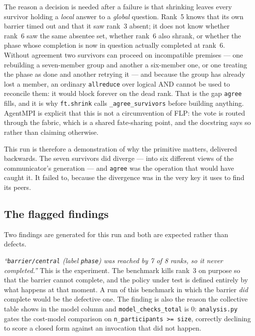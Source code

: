 \documentclass[11pt]{article}
\begin{document}
The reason a decision is needed after a failure is that shrinking leaves every survivor
holding a \emph{local} answer to a \emph{global} question. Rank~5 knows that its own
barrier timed out and that it saw rank~3 absent; it does not know whether rank~6 saw the
same absentee set, whether rank~6 also shrank, or whether the phase whose completion is
now in question actually completed at rank~6. Without agreement two survivors can proceed
on incompatible premises --- one rebuilding a seven-member group and another a six-member
one, or one treating the phase as done and another retrying it --- and because the group
has already lost a member, an ordinary \texttt{allreduce} over logical AND cannot be used
to reconcile them: it would block forever on the dead rank. That is the gap
\texttt{agree} fills, and it is why \texttt{ft.shrink} calls
\texttt{\_agree\_survivors} before building anything. AgentMPI is explicit that this is
not a circumvention of FLP: the vote is routed through the fabric, which is a shared
fate-sharing point, and the docstring says so rather than claiming otherwise.

This run is therefore a demonstration of why the primitive matters, delivered backwards.
The seven survivors did diverge --- into six different views of the communicator's
generation --- and \texttt{agree} was the operation that would have caught it. It failed
to, because the divergence was in the very key it uses to find its peers.

\subsection{The flagged findings}

Two findings are generated for this run and both are expected rather than defects.

\emph{``\texttt{barrier/central} (label \texttt{phase}) was reached by 7 of 8 ranks, so it
never completed.''} This is the experiment. The benchmark kills rank~3 on purpose so that
the barrier cannot complete, and the policy under test is defined entirely by what happens
at that moment. A run of this benchmark in which the barrier \emph{did} complete would be
the defective one. The finding is also the reason the collective table shows \modelna{} in
the model column and \texttt{model\_checks\_total} is 0: \texttt{analysis.py} gates the
cost-model comparison on \texttt{n\_participants >= size}, correctly declining to score a
closed form against an invocation that did not happen.
\end{document}
